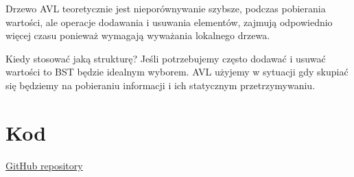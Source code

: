 \documentclass[11pt,a4paper]{article}
\begin{document}
Drzewo AVL teoretycznie jest nieporównywanie szybsze, podczas pobierania wartości, ale operacje dodawania i usuwania elementów, zajmują odpowiednio więcej czasu ponieważ wymagają wyważania lokalnego drzewa.

Kiedy stosować jaką strukturę? Jeśli potrzebujemy często dodawać i usuwać wartości to BST będzie idealnym wyborem. AVL użyjemy w sytuacji gdy skupiać się będziemy na pobieraniu informacji i ich statycznym przetrzymywaniu.

\section{Kod}

\href{https://github.com/McSymilian/AISD_PUT_Testing_Support/tree/master/src/main/java/org/data_structures/tree}{GitHub repository}
\end{document}
